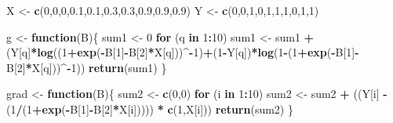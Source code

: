 \documentclass[
]{article}
\newenvironment{Shaded}{\begin{snugshade}}{\end{snugshade}}
\newcommand{\ControlFlowTok}[1]{\textcolor[rgb]{0.13,0.29,0.53}{\textbf{#1}}}
\newcommand{\DecValTok}[1]{\textcolor[rgb]{0.00,0.00,0.81}{#1}}
\newcommand{\FloatTok}[1]{\textcolor[rgb]{0.00,0.00,0.81}{#1}}
\newcommand{\FunctionTok}[1]{\textcolor[rgb]{0.13,0.29,0.53}{\textbf{#1}}}
\newcommand{\NormalTok}[1]{#1}
\newcommand{\OtherTok}[1]{\textcolor[rgb]{0.56,0.35,0.01}{#1}}
\newcommand{\SpecialCharTok}[1]{\textcolor[rgb]{0.81,0.36,0.00}{\textbf{#1}}}
\begin{document}
\begin{Shaded}
\begin{Highlighting}[]
\NormalTok{X }\OtherTok{\textless{}{-}} \FunctionTok{c}\NormalTok{(}\DecValTok{0}\NormalTok{,}\DecValTok{0}\NormalTok{,}\DecValTok{0}\NormalTok{,}\FloatTok{0.1}\NormalTok{,}\FloatTok{0.1}\NormalTok{,}\FloatTok{0.3}\NormalTok{,}\FloatTok{0.3}\NormalTok{,}\FloatTok{0.9}\NormalTok{,}\FloatTok{0.9}\NormalTok{,}\FloatTok{0.9}\NormalTok{)}
\NormalTok{Y }\OtherTok{\textless{}{-}} \FunctionTok{c}\NormalTok{(}\DecValTok{0}\NormalTok{,}\DecValTok{0}\NormalTok{,}\DecValTok{1}\NormalTok{,}\DecValTok{0}\NormalTok{,}\DecValTok{1}\NormalTok{,}\DecValTok{1}\NormalTok{,}\DecValTok{1}\NormalTok{,}\DecValTok{0}\NormalTok{,}\DecValTok{1}\NormalTok{,}\DecValTok{1}\NormalTok{)}

\NormalTok{g }\OtherTok{\textless{}{-}} \ControlFlowTok{function}\NormalTok{(B)\{}
\NormalTok{  sum1 }\OtherTok{\textless{}{-}} \DecValTok{0}
  \ControlFlowTok{for}\NormalTok{ (q }\ControlFlowTok{in} \DecValTok{1}\SpecialCharTok{:}\DecValTok{10}\NormalTok{)}
\NormalTok{    sum1 }\OtherTok{\textless{}{-}}\NormalTok{ sum1 }\SpecialCharTok{+}\NormalTok{ (Y[q]}\SpecialCharTok{*}\FunctionTok{log}\NormalTok{((}\DecValTok{1}\SpecialCharTok{+}\FunctionTok{exp}\NormalTok{(}\SpecialCharTok{{-}}\NormalTok{B[}\DecValTok{1}\NormalTok{]}\SpecialCharTok{{-}}\NormalTok{B[}\DecValTok{2}\NormalTok{]}\SpecialCharTok{*}\NormalTok{X[q]))}\SpecialCharTok{\^{}{-}}\DecValTok{1}\NormalTok{)}\SpecialCharTok{+}\NormalTok{(}\DecValTok{1}\SpecialCharTok{{-}}\NormalTok{Y[q])}\SpecialCharTok{*}\FunctionTok{log}\NormalTok{(}\DecValTok{1}\SpecialCharTok{{-}}\NormalTok{(}\DecValTok{1}\SpecialCharTok{+}\FunctionTok{exp}\NormalTok{(}\SpecialCharTok{{-}}\NormalTok{B[}\DecValTok{1}\NormalTok{]}\SpecialCharTok{{-}}\NormalTok{B[}\DecValTok{2}\NormalTok{]}\SpecialCharTok{*}\NormalTok{X[q]))}\SpecialCharTok{\^{}{-}}\DecValTok{1}\NormalTok{))}
  \FunctionTok{return}\NormalTok{(sum1)}
\NormalTok{\}}

\NormalTok{grad }\OtherTok{\textless{}{-}} \ControlFlowTok{function}\NormalTok{(B)\{}
\NormalTok{  sum2 }\OtherTok{\textless{}{-}} \FunctionTok{c}\NormalTok{(}\DecValTok{0}\NormalTok{,}\DecValTok{0}\NormalTok{)}
  \ControlFlowTok{for}\NormalTok{ (i }\ControlFlowTok{in} \DecValTok{1}\SpecialCharTok{:}\DecValTok{10}\NormalTok{)}
\NormalTok{    sum2 }\OtherTok{\textless{}{-}}\NormalTok{ sum2 }\SpecialCharTok{+}\NormalTok{ ((Y[i] }\SpecialCharTok{{-}}\NormalTok{ (}\DecValTok{1}\SpecialCharTok{/}\NormalTok{(}\DecValTok{1}\SpecialCharTok{+}\FunctionTok{exp}\NormalTok{(}\SpecialCharTok{{-}}\NormalTok{B[}\DecValTok{1}\NormalTok{]}\SpecialCharTok{{-}}\NormalTok{B[}\DecValTok{2}\NormalTok{]}\SpecialCharTok{*}\NormalTok{X[i])))) }\SpecialCharTok{*} \FunctionTok{c}\NormalTok{(}\DecValTok{1}\NormalTok{,X[i]))}
  \FunctionTok{return}\NormalTok{(sum2)}
\NormalTok{\}}


\end{Highlighting}
\end{Shaded}
\end{document}
